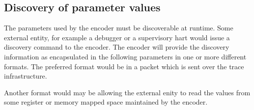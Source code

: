 \FloatBarrier

\subsection {Discovery of parameter values}

The parameters used by the encoder must be discoverable at
runtime. Some external entity, for example a debugger or a supervisory
hart would issue a discovery command to the encoder. The encoder will
provide the discovery information as encapsulated in the following
parameters in one or more different formats.  The preferred format
would be in a packet which is sent over the trace infrastructure.

Another format would may be allowing the external enity to read the
values from some register or memory mapped space maintained by the
encoder.

